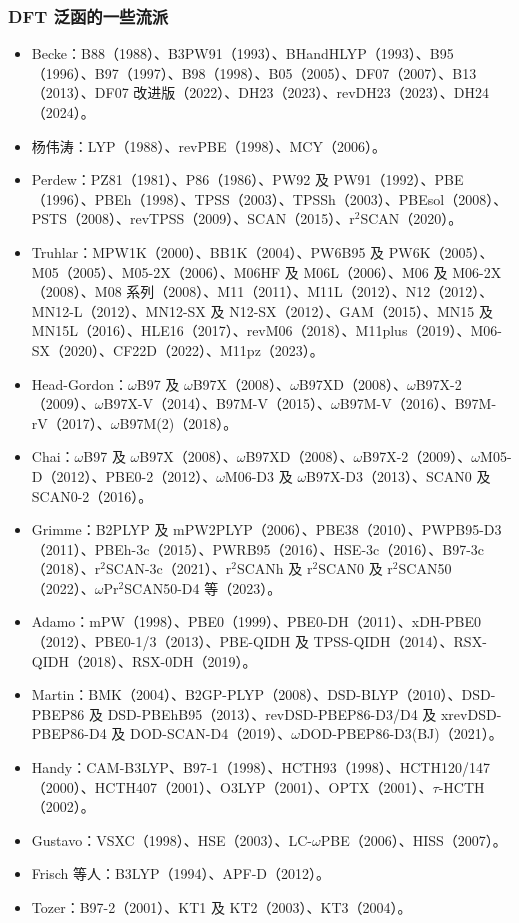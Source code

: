 \subsubsection*{DFT 泛函的一些流派}

\begingroup
\small
\begin{itemize}
  \item Becke：B88（1988）、B3PW91（1993）、BHandHLYP（1993）、B95（1996）、B97（1997）、B98（1998）、B05（2005）、DF07（2007）、B13（2013）、DF07 改进版（2022）、DH23（2023）、revDH23（2023）、DH24（2024）。
  \item 杨伟涛：LYP（1988）、revPBE（1998）、MCY（2006）。
  \item Perdew：PZ81（1981）、P86（1986）、PW92 及 PW91（1992）、PBE（1996）、PBEh（1998）、TPSS（2003）、TPSSh（2003）、PBEsol（2008）、PSTS（2008）、revTPSS（2009）、SCAN（2015）、r$^2$SCAN（2020）。
  \item Truhlar：MPW1K（2000）、BB1K（2004）、PW6B95 及 PW6K（2005）、M05（2005）、M05-2X（2006）、M06HF 及 M06L（2006）、M06 及 M06-2X（2008）、M08 系列（2008）、M11（2011）、M11L（2012）、N12（2012）、MN12-L（2012）、MN12-SX 及 N12-SX（2012）、GAM（2015）、MN15 及 MN15L（2016）、HLE16（2017）、revM06（2018）、M11plus（2019）、M06-SX（2020）、CF22D（2022）、M11pz（2023）。
  \item Head-Gordon：$\omega$B97 及 $\omega$B97X（2008）、$\omega$B97XD（2008）、$\omega$B97X-2（2009）、$\omega$B97X-V（2014）、B97M-V（2015）、$\omega$B97M-V（2016）、B97M-rV（2017）、$\omega$B97M(2)（2018）。
  \item Chai：$\omega$B97 及 $\omega$B97X（2008）、$\omega$B97XD（2008）、$\omega$B97X-2（2009）、$\omega$M05-D（2012）、PBE0-2（2012）、$\omega$M06-D3 及 $\omega$B97X-D3（2013）、SCAN0 及 SCAN0-2（2016）。
  \item Grimme：B2PLYP 及 mPW2PLYP（2006）、PBE38（2010）、PWPB95-D3（2011）、PBEh-3c（2015）、PWRB95（2016）、HSE-3c（2016）、B97-3c（2018）、r$^2$SCAN-3c（2021）、r$^2$SCANh 及 r$^2$SCAN0 及 r$^2$SCAN50（2022）、$\omega$Pr$^2$SCAN50-D4 等（2023）。
  \item Adamo：mPW（1998）、PBE0（1999）、PBE0-DH（2011）、xDH-PBE0（2012）、PBE0-1/3（2013）、PBE-QIDH 及 TPSS-QIDH（2014）、RSX-QIDH（2018）、RSX-0DH（2019）。
  \item Martin：BMK（2004）、B2GP-PLYP（2008）、DSD-BLYP（2010）、DSD-PBEP86 及 DSD-PBEhB95（2013）、revDSD-PBEP86-D3/D4 及 xrevDSD-PBEP86-D4 及 DOD-SCAN-D4（2019）、$\omega$DOD-PBEP86-D3(BJ)（2021）。
  \item Handy：CAM-B3LYP、B97-1（1998）、HCTH93（1998）、HCTH120/147（2000）、HCTH407（2001）、O3LYP（2001）、OPTX（2001）、$\tau$-HCTH（2002）。
  \item Gustavo：VSXC（1998）、HSE（2003）、LC-$\omega$PBE（2006）、HISS（2007）。
  \item Frisch 等人：B3LYP（1994）、APF-D（2012）。
  \item Tozer：B97-2（2001）、KT1 及 KT2（2003）、KT3（2004）。
\end{itemize}
\endgroup
